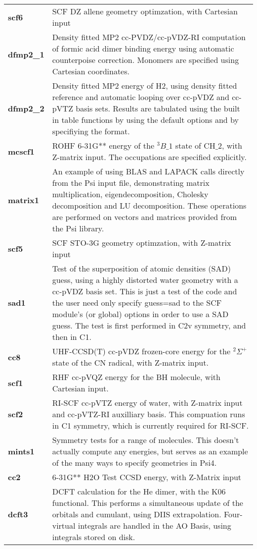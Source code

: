 \begin{tabular*}{\textwidth}[tb]{p{}p{}}
{\bf scf6} &  SCF DZ allene geometry optimzation, with Cartesian input\\
{\bf dfmp2\_1} &  Density fitted MP2 cc-PVDZ/cc-pVDZ-RI computation of formic acid dimer binding energy using automatic counterpoise correction.  Monomers are specified using Cartesian coordinates.\\
{\bf dfmp2\_2} &  Density fitted MP2 energy of H2, using density fitted reference and automatic looping over cc-pVDZ and cc-pVTZ basis sets. Results are tabulated using the built in table functions by using the default options and by specifiying the format.\\
{\bf mcscf1} &  ROHF 6-31G** energy of the $^3B\_1$ state of CH$\_2$, with Z-matrix input. The occupations are specified explicitly.\\
{\bf matrix1} &  An example of using BLAS and LAPACK calls directly from the Psi input file, demonstrating matrix multiplication, eigendecomposition, Cholesky decomposition and LU decomposition. These operations are performed on vectors and matrices provided from the Psi library.\\
{\bf scf5} &  SCF STO-3G geometry optimzation, with Z-matrix input\\
{\bf sad1} &  Test of the superposition of atomic densities (SAD) guess, using a highly distorted water geometry with a cc-pVDZ basis set.  This is just a test of the code and the user need only specify guess=sad to the SCF module's (or global) options in order to use a SAD guess. The test is first performed in C2v symmetry, and then in C1.\\
{\bf cc8} &  UHF-CCSD(T) cc-pVDZ frozen-core energy for the $^2\Sigma^+$ state of the CN radical, with Z-matrix input.\\
{\bf scf1} &  RHF cc-pVQZ energy for the BH molecule, with Cartesian input.\\
{\bf scf2} &  RI-SCF cc-pVTZ energy of water, with Z-matrix input and cc-pVTZ-RI auxilliary basis. This compuation runs in C1 symmetry, which is currently required for RI-SCF.\\
{\bf mints1} &  Symmetry tests for a range of molecules.  This doesn't actually compute any energies, but serves as an example of the many ways to specify geometries in Psi4.\\
{\bf cc2} &  6-31G** H2O Test CCSD energy, with Z-Matrix input\\
{\bf dcft3} &  DCFT calculation for the He dimer, with the K06 functional. This performs a simultaneous update of the orbitals and cumulant, using DIIS extrapolation. Four-virtual integrals are handled in the AO Basis, using integrals stored on disk.\\

\end{tabular*}
